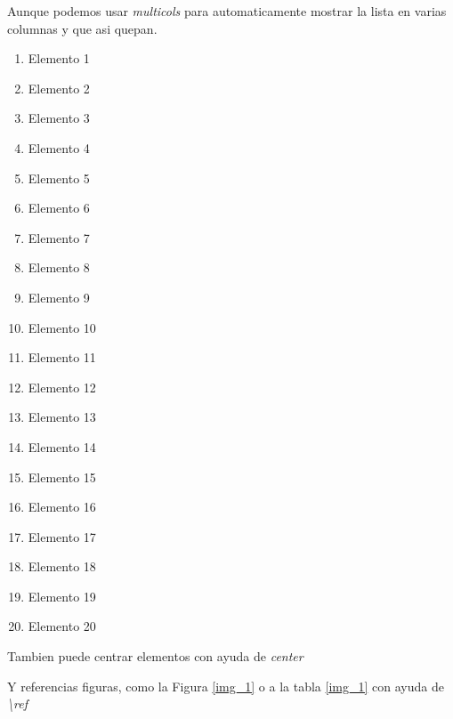 \documentclass{beamer}
\begin{document}
\begin{frame}
    Aunque podemos usar \emph{multicols} para automaticamente mostrar la lista en varias columnas y que asi quepan.
 
    \begin{multicols}{3}
        \begin{enumerate}
            \item Elemento 1
            \item Elemento 2
            \item Elemento 3
            \item Elemento 4
            \item Elemento 5
            \item Elemento 6
            \item Elemento 7
            \item Elemento 8
            \item Elemento 9
            \item Elemento 10
            \item Elemento 11
            \item Elemento 12
            \item Elemento 13
            \item Elemento 14
            \item Elemento 15
            \item Elemento 16
            \item Elemento 17
            \item Elemento 18
            \item Elemento 19
            \item Elemento 20
        \end{enumerate}
    \end{multicols}
 
 
\end{frame}
 
\begin{frame}
    \begin{center}
        Tambien puede centrar elementos con ayuda de \emph{center}
    \end{center}    
\end{frame}
 
\begin{frame}
    Y referencias figuras, como la Figura \ref{img_1} o a la tabla \ref{img_1} con ayuda de  \emph{\textbackslash ref}
\end{frame}
 
\end{document}
